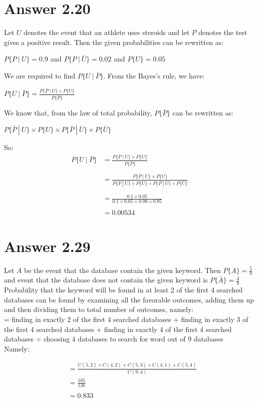 \documentclass[12pt]{article}
\begin{document}
\section*{Answer 2.20}
Let $U$ denotes the event that an athlete uses steroids and let $P$ denotes the test gives a positive result. Then the given probabilities can be rewritten as:
\begin{center}
$P\{P\ |\ U\} = 0.9$ and $P\{P\ |\ \bar{U}\} = 0.02$ and $P\{U\} = 0.05$
\end{center}
We are required to find $P\{U\ | \ \bar{P}\}$. From the Bayes's rule, we have:
\begin{center}
$P\{U\ | \ \bar{P}\} = \frac{P\{\bar{P}\ |\ U\}\times P\{U\}}{P\{\bar{P}\}}$
\end{center}
We know that, from the law of total probability, $P\{\bar{P}\}$ can be rewritten as:
\begin{center}
$P\{\bar{P}\ |\ U\}\times P\{U\} \times P\{\bar{P}\ |\ \bar{U}\}\times P\{\bar{U}\}$
\end{center} 
So: 
\begin{align*}
P\{U\ | \ \bar{P}\} &= \frac{P\{\bar{P}\ |\ U\}\times P\{U\}}{P\{\bar{P}\}}  \\\\
&= \frac{P\{\bar{P}\ |\ U\}\times P\{U\}}{P\{\bar{P}\ |\ U\}\times P\{U\} \times P\{\bar{P}\ |\ \bar{U}\}\times P\{\bar{U}\}}  \\\\
&= \frac{0.1 \times 0.05}{0.1 \times 0.05 + 0.98 \times 0.95} \\\\
&= 0.00534
\end{align*}

\section*{Answer 2.29}

Let $A$ be the event that the database contain the given keyword. Then $P\{A\}=\frac{5}{9}$ and event that the database does not contain the given keyword is $P\{\bar{A}\}=\frac{4}{9}$ \\

Probability that the keyword will be found in at least 2 of the first 4 searched databases can be found by examining all the favorable outcomes, adding them up and then dividing them to total number of outcomes, namely: \\

 = finding in exactly 2 of the first 4 searched databases + finding in exactly 3 of the first 4 searched databases + finding in exactly 4 of the first 4 searched databases $\div$ choosing 4 databases to search for word out of 9 databases \\
 
Namely:
 
\begin{align*}
&= \frac{C(5,2)\times C(4,2) + C(5,3) \times C(4,1) + C(5,4)}{C(9,4)} \\
&= \frac{105}{126} \\\\
&= 0.833 
\end{align*}
\end{document}
